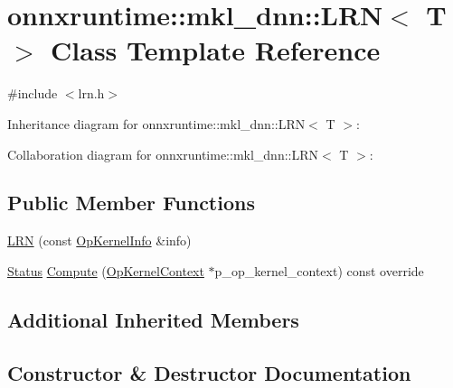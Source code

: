 \hypertarget{classonnxruntime_1_1mkl__dnn_1_1LRN}{}\section{onnxruntime\+:\+:mkl\+\_\+dnn\+:\+:L\+RN$<$ T $>$ Class Template Reference}
\label{classonnxruntime_1_1mkl__dnn_1_1LRN}


{\ttfamily \#include $<$lrn.\+h$>$}



Inheritance diagram for onnxruntime\+:\+:mkl\+\_\+dnn\+:\+:L\+RN$<$ T $>$\+:


Collaboration diagram for onnxruntime\+:\+:mkl\+\_\+dnn\+:\+:L\+RN$<$ T $>$\+:
\subsection*{Public Member Functions}
\begin{DoxyCompactItemize}
\item 
\mbox{\hyperlink{classonnxruntime_1_1mkl__dnn_1_1LRN_a304f0734d88e051fbc2bbe9ce2c16af6}{L\+RN}} (const \mbox{\hyperlink{classonnxruntime_1_1OpKernelInfo}{Op\+Kernel\+Info}} \&info)
\item 
\mbox{\hyperlink{classonnxruntime_1_1common_1_1Status}{Status}} \mbox{\hyperlink{classonnxruntime_1_1mkl__dnn_1_1LRN_a8167c16afafb252e4c04542b0b37c3f2}{Compute}} (\mbox{\hyperlink{classonnxruntime_1_1OpKernelContext}{Op\+Kernel\+Context}} $\ast$p\+\_\+op\+\_\+kernel\+\_\+context) const override
\end{DoxyCompactItemize}
\subsection*{Additional Inherited Members}


\subsection{Constructor \& Destructor Documentation}
\mbox{\label{classonnxruntime_1_1mkl__dnn_1_1LRN_a304f0734d88e051fbc2bbe9ce2c16af6}} 
